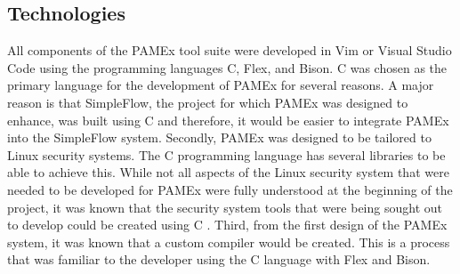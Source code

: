 \subsection{Technologies}
\par 
\vspace{\baselineskip}
\hspace{1em}
All components of the PAMEx tool suite were developed in Vim or Visual 
Studio Code using the programming languages C, Flex, and Bison. 
C was chosen as the primary language for the 
development of PAMEx for several reasons. A major reason is that 
SimpleFlow, the project for which PAMEx was designed to enhance, was 
built using C \cite{ryan2016} and therefore, it would be easier to integrate PAMEx into the 
SimpleFlow system. Secondly, PAMEx was designed to be tailored to Linux 
security systems. The C programming language has several libraries to 
be able to achieve this. While not all 
aspects of the Linux security system that were needed to be developed for PAMEx were fully understood at 
the beginning of the project, it was known that the security system 
tools that were being sought out to develop could be created using C \cite{linuxpam}\cite{man7pam}\cite{man7xattr}\cite{selinux}. 
Third, from the first design of the PAMEx system, it was known that a custom compiler would be created. 
This is a process that was familiar to the developer using the C language with Flex and Bison. 
\vspace{\baselineskip}

